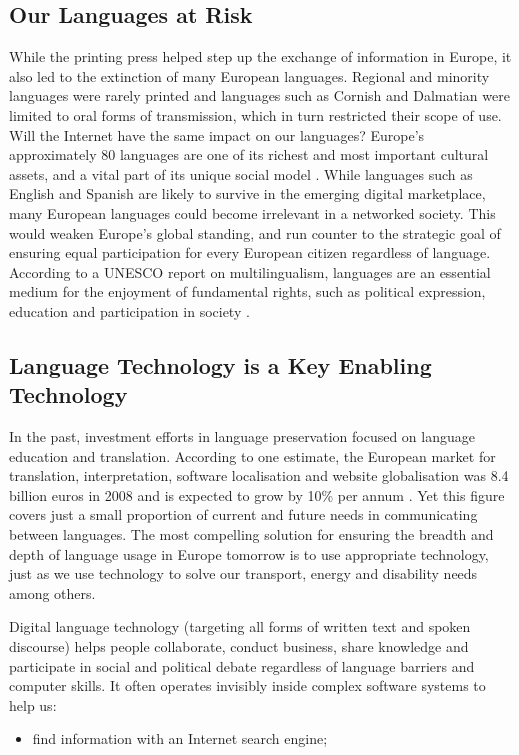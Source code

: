 \begin{multicols}{2}
\subsection{Our Languages at Risk}

While the printing press helped step up the exchange of
information in Europe, it also led to the extinction of many European
languages. Regional and minority languages were rarely printed and
languages such as Cornish and Dalmatian were limited to oral forms of
transmission, which in turn restricted their scope of use. Will the
Internet have the same impact on our languages?
Europe’s approximately 80 languages are one of its richest and most
important cultural assets, and a vital part of its unique social
model \cite{EC-multi}. While languages such as English and Spanish are
likely to survive in the emerging digital marketplace, many European
languages could become irrelevant in a networked society. This would
weaken Europe’s global standing, and run counter to the strategic goal
of ensuring equal participation for every European citizen regardless
of language. According to a UNESCO report on multilingualism,
languages are an essential medium for the enjoyment of fundamental
rights, such as political expression, education and participation in
society \cite{UN-mid}.

\subsection{Language Technology is a Key Enabling Technology}

In the past, investment efforts in language preservation focused
on language education and translation. According to one estimate, the
European market for translation, interpretation, software localisation
and website globalisation was 8.4 billion euros in 2008 and is
expected to grow by 10\% per annum \cite{EC-size}. Yet this figure
covers just a small proportion of current and future needs in
communicating between languages. The most compelling solution for
ensuring the breadth and depth of language usage in Europe tomorrow is
to use appropriate technology, just as we use technology to solve our
transport, energy and disability needs among others.

Digital language technology (targeting all forms of written text and spoken
discourse) helps people collaborate, conduct business, share knowledge and
participate in social and political debate regardless of language barriers and
computer skills. It often operates invisibly inside complex software systems to
help us:
\begin{itemize}
\item find information with an Internet search engine;


\end{itemize}
\end{multicols}
